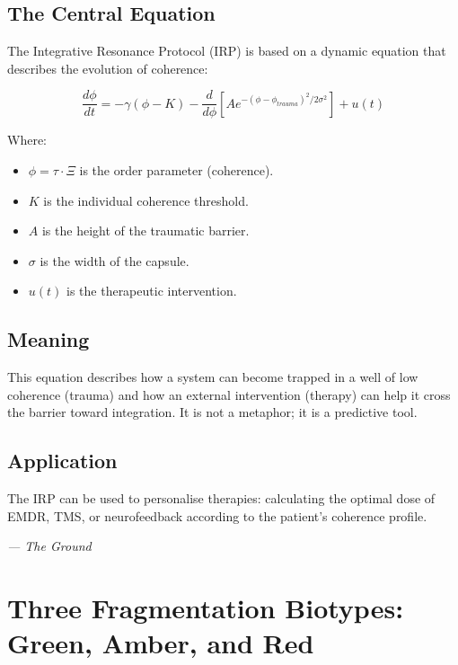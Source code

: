 \documentclass[12pt,a4paper,openany]{book}
\begin{document}
\section{The Central Equation}
The Integrative Resonance Protocol (IRP) is based on a dynamic equation that describes the evolution of coherence:

\begin{equation}
\frac{d\phi}{dt} = -\gamma(\phi - K) - \frac{d}{d\phi}\left[A e^{-(\phi-\phi_{trauma})^2/2\sigma^2}\right] + u(t)
\end{equation}

Where:
\begin{itemize}
\item $\phi = \tau \cdot \Xi$ is the order parameter (coherence).
\item $K$ is the individual coherence threshold.
\item $A$ is the height of the traumatic barrier.
\item $\sigma$ is the width of the capsule.
\item $u(t)$ is the therapeutic intervention.
\end{itemize}

\section{Meaning}
This equation describes how a system can become trapped in a well of low coherence (trauma) and how an external intervention (therapy) can help it cross the barrier toward integration. It is not a metaphor; it is a predictive tool.

\section{Application}
The IRP can be used to personalise therapies: calculating the optimal dose of EMDR, TMS, or neurofeedback according to the patient's coherence profile.


\medskip
\begin{firma}
\raggedleft\small\itshape --- The Ground
\end{firma}

\newpage

\chapter{Three Fragmentation Biotypes: Green, Amber, and Red}
\label{chap:biotipos}
\end{document}
